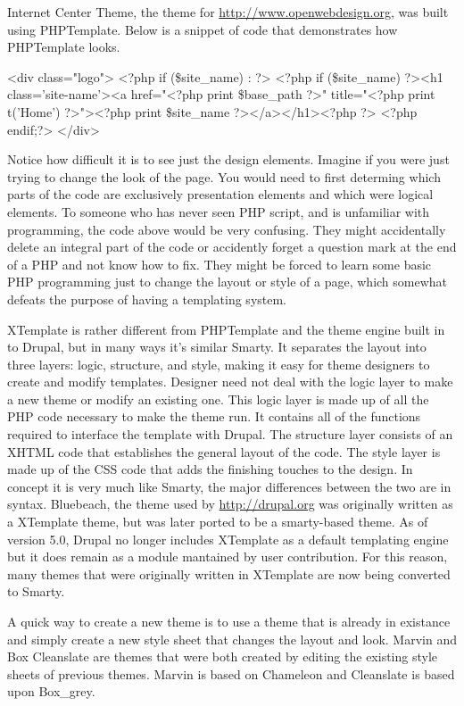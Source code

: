 \documentclass[a4paper,12pt]{report}
\begin{document}
Internet Center Theme, the theme for \url{http://www.openwebdesign.org}, was built using PHPTemplate. Below is a snippet of code that demonstrates how PHPTemplate looks. 

<div class="logo">
        <?php if (\$site_name) : ?>
            <?php if (\$site_name) { ?><h1 class='site-name'><a href="<?php print \$base_path ?>" title="<?php print t('Home') ?>"><?php print \$site_name ?></a></h1><?php } ?>
        <?php endif;?>
</div>

Notice how difficult it is to see just the design elements. 
Imagine if you were just trying to change the look of the page. You would need to first determing which parts of the code are exclusively presentation elements and which were logical elements. 
To someone who has never seen PHP script, and is unfamiliar with programming, the code above would be very confusing. 
They might accidentally delete an integral part of the code or accidently forget a question mark at the end of a PHP and not know how to fix. 
They might be forced to learn some basic PHP programming just to change the layout or style of a page, which somewhat defeats the purpose of having a templating system.


XTemplate is rather different from PHPTemplate and the theme engine built in to Drupal, but in many ways it's similar Smarty. 
It separates the layout into three layers: logic, structure, and style, making it easy for theme designers to create and modify templates. 
Designer need not deal with the logic layer to make a new theme or modify an existing one. 
This logic layer is made up of all the PHP code necessary to make the theme run. 
It contains all of the functions required to interface the template with Drupal. 
The structure layer consists of an XHTML code that establishes the general layout of the code. 
The style layer is made up of the CSS code that adds the finishing touches to the design. 
In concept it is very much like Smarty, the major differences between the two are in syntax.
Bluebeach, the theme used by \url{http://drupal.org} was originally written as a XTemplate theme, but was later ported to be a smarty-based theme. As of version 5.0, Drupal no longer includes XTemplate as a default templating engine but it does remain as a module mantained by user contribution. 
For this reason, many themes that were originally written in XTemplate are now being converted to Smarty. 


A quick way to create a new theme is to use a theme that is already in existance and simply create a new style sheet that changes the layout and look. 
Marvin and Box Cleanslate are themes that were both created by editing the existing style sheets of previous themes. 
Marvin is based on Chameleon and Cleanslate is based upon Box\_grey.  
\end{document}
